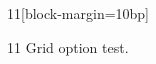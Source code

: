 \documentclass[paper=A4]{ropas-poster}
\begin{document}
\begin{postergrid}{1}{1}[block-margin=10bp]
\begin{posterblock}{1}{1}
Grid option test.
\end{posterblock}
\end{postergrid}
\end{document}
